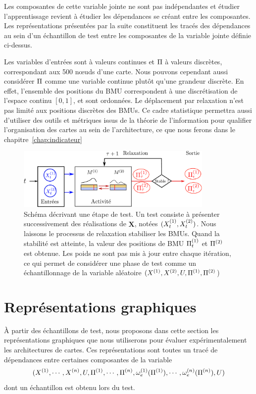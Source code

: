 \documentclass[../main]{subfiles}
\begin{document}
Les composantes de cette variable jointe ne sont pas indépendantes et étudier l'apprentissage revient à étudier les dépendances se créant entre les composantes.
Les représentations présentées par la suite constituent les tracés des dépendances au sein d'un échantillon de test entre les composantes de la variable jointe définie ci-dessus.

Les variables d'entrées sont à valeurs continues et $\Pi$ à valeurs discrètes, correspondant aux 500 n\oe{}uds d'une carte. 
Nous pouvons cependant aussi considérer $\Pi$ comme une variable continue plutôt qu'une grandeur discrète. 
En effet, l'ensemble des positions du BMU correspondent à une discrétisation de l'espace continu $[0,1]$, et sont ordonnées. Le déplacement par relaxation n'est pas limité aux positions discrètes des BMUs.
Ce cadre statistique permettra aussi d'utiliser des outils et métriques issus de la théorie de l'information pour qualifier l'organisation des cartes au sein de l'architecture, ce que nous ferons dans le chapitre~\ref{chap:indicateur}

\begin{figure}
\centering
\includegraphics[width=0.85\textwidth]{tests_2maps.pdf}
\caption{Schéma décrivant une étape de test. Un test consiste à présenter successivement des réalisations de $\mathbf{X}$, notées $(X^{({1})}_t,X^{({2})}_t)$. Nous laissons le processus de relaxation stabiliser les BMUs. Quand la stabilité est atteinte, la valeur des positions de BMU $\Pi^{({1})}_t$ et $\Pi^{({2})}$ est obtenue. Les poids ne sont pas mis à jour entre chaque itération, ce qui permet de considérer une phase de test comme un échantillonnage de la variable aléatoire $(X^{({1})},X^{({2})}, U, \Pi^{({1})}, \Pi^{({2})}$) }
\label{fig:flowchart}
\end{figure}

\section{Représentations graphiques}

\`A partir des échantillons de test, nous proposons dans cette section les représentations graphiques que nous utiliserons pour évaluer expérimentalement les architectures de cartes.
Ces représentations sont toutes un tracé de dépendances entre certaines composantes de la variable $$(X^{({1})}, \cdots, X^{({n})}, U, \Pi^{({1})}, \cdots, \Pi^{({n})}, \omega_e^{({1})}(\Pi^{({1})}), \cdots, \omega_e^{({n})}(\Pi^{({n})}),U)$$ dont un échantillon est obtenu lors du test.
\end{document}
